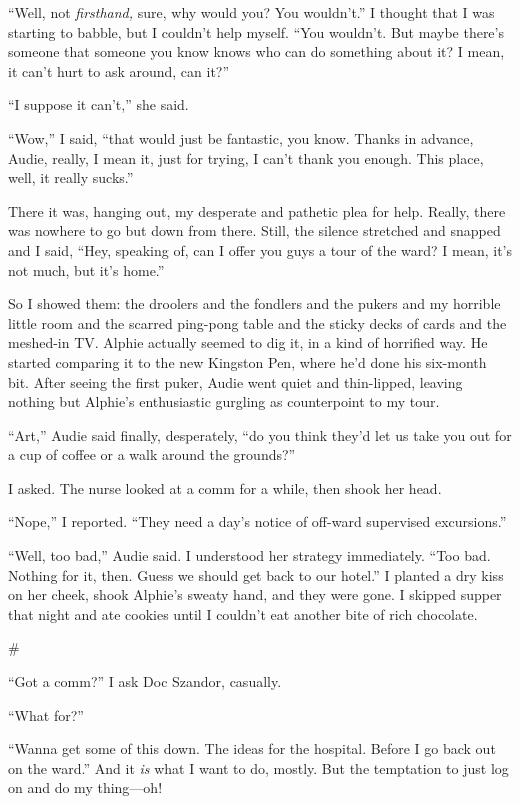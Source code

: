 “Well, not \emph{firsthand,} sure, why would you? You wouldn’t.” I
thought that I was starting to babble, but I couldn’t help myself.
“You wouldn’t. But maybe there’s someone that someone you know
knows who can do something about it? I mean, it can’t hurt to ask
around, can it?”

“I suppose it can’t,” she said.

“Wow,” I said, “that would just be fantastic, you know. Thanks in
advance, Audie, really, I mean it, just for trying, I can’t thank
you enough. This place, well, it really sucks.”

There it was, hanging out, my desperate and pathetic plea for help.
Really, there was nowhere to go but down from there. Still, the
silence stretched and snapped and I said, “Hey, speaking of, can I
offer you guys a tour of the ward? I mean, it’s not much, but it’s
home.”

So I showed them: the droolers and the fondlers and the pukers and
my horrible little room and the scarred ping-pong table and the
sticky decks of cards and the meshed-in TV. Alphie actually seemed
to dig it, in a kind of horrified way. He started comparing it to
the new Kingston Pen, where he’d done his six-month bit. After
seeing the first puker, Audie went quiet and thin-lipped, leaving
nothing but Alphie’s enthusiastic gurgling as counterpoint to my
tour.

“Art,” Audie said finally, desperately, “do you think they’d let us
take you out for a cup of coffee or a walk around the grounds?”

I asked. The nurse looked at a comm for a while, then shook her
head.

“Nope,” I reported. “They need a day’s notice of off-ward
supervised excursions.”

“Well, too bad,” Audie said. I understood her strategy immediately.
“Too bad. Nothing for it, then. Guess we should get back to our
hotel.” I planted a dry kiss on her cheek, shook Alphie’s sweaty
hand, and they were gone. I skipped supper that night and ate
cookies until I couldn’t eat another bite of rich chocolate.

\#

“Got a comm?” I ask Doc Szandor, casually.

“What for?”

“Wanna get some of this down. The ideas for the hospital. Before I
go back out on the ward.” And it \emph{is} what I want to do,
mostly. But the temptation to just log on and do my thing—oh!

